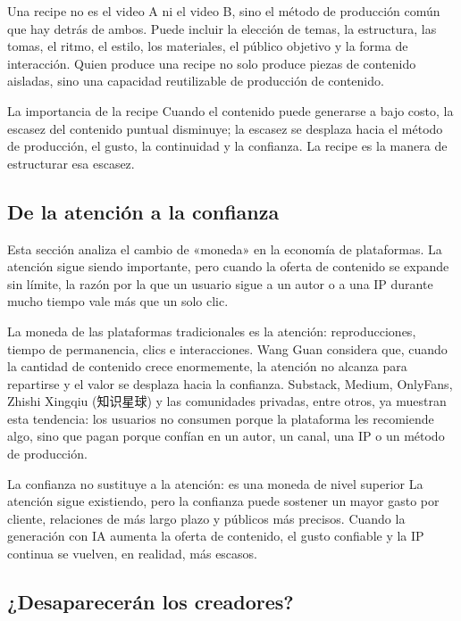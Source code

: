 Una recipe no es el video A ni el video B, sino el método de producción común que hay detrás de ambos. Puede incluir la elección de temas, la estructura, las tomas, el ritmo, el estilo, los materiales, el público objetivo y la forma de interacción. Quien produce una recipe no solo produce piezas de contenido aisladas, sino una capacidad reutilizable de producción de contenido.

\begin{importantbox}{La importancia de la recipe}
Cuando el contenido puede generarse a bajo costo, la escasez del contenido puntual disminuye; la escasez se desplaza hacia el método de producción, el gusto, la continuidad y la confianza. La recipe es la manera de estructurar esa escasez.
\end{importantbox}

\subsection{De la atención a la confianza}

Esta sección analiza el cambio de «moneda» en la economía de plataformas. La atención sigue siendo importante, pero cuando la oferta de contenido se expande sin límite, la razón por la que un usuario sigue a un autor o a una IP durante mucho tiempo vale más que un solo clic.

La moneda de las plataformas tradicionales es la atención: reproducciones, tiempo de permanencia, clics e interacciones. Wang Guan considera que, cuando la cantidad de contenido crece enormemente, la atención no alcanza para repartirse y el valor se desplaza hacia la confianza. Substack, Medium, OnlyFans, Zhishi Xingqiu (知识星球) y las comunidades privadas, entre otros, ya muestran esta tendencia: los usuarios no consumen porque la plataforma les recomiende algo, sino que pagan porque confían en un autor, un canal, una IP o un método de producción.

\begin{warningbox}{La confianza no sustituye a la atención: es una moneda de nivel superior}
La atención sigue existiendo, pero la confianza puede sostener un mayor gasto por cliente, relaciones de más largo plazo y públicos más precisos. Cuando la generación con IA aumenta la oferta de contenido, el gusto confiable y la IP continua se vuelven, en realidad, más escasos.
\end{warningbox}

\subsection{¿Desaparecerán los creadores?}


